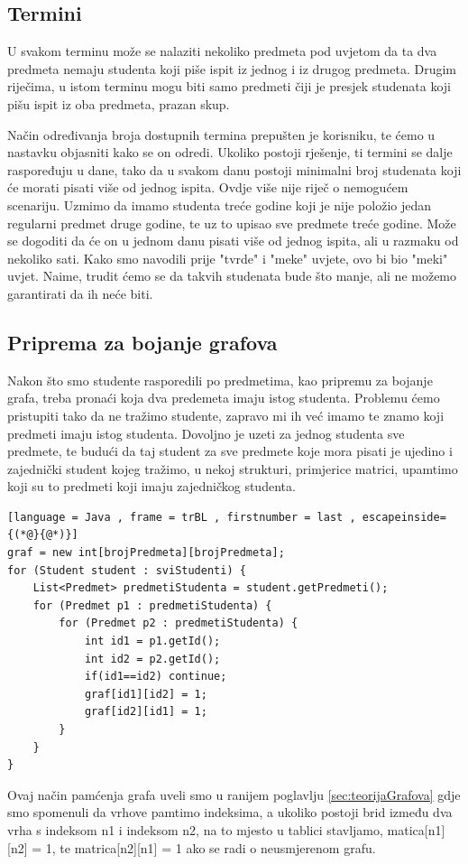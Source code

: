 \documentclass[times, utf8, zavrsni, numeric]{fer}
\begin{document}
\subsection*{Termini}
U svakom terminu može se nalaziti nekoliko predmeta pod uvjetom da ta dva predmeta nemaju studenta koji piše ispit iz jednog i iz drugog predmeta. Drugim riječima, u istom terminu mogu biti samo predmeti čiji je presjek studenata koji pišu ispit iz oba predmeta, prazan skup.\par
Način određivanja broja dostupnih termina prepušten je korisniku, te ćemo u nastavku objasniti kako se on odredi. Ukoliko postoji rješenje, ti termini se dalje raspoređuju u dane, tako da u svakom danu postoji minimalni broj studenata koji će morati pisati više od jednog ispita. Ovdje više nije riječ o nemogućem scenariju.
Uzmimo da imamo studenta treće godine koji je nije položio jedan regularni predmet druge godine, te uz to upisao sve predmete treće godine. Može se dogoditi da će on u jednom danu pisati više od jednog ispita, ali u razmaku od nekoliko sati. Kako smo navodili prije "tvrde" i "meke" uvjete, ovo bi bio "meki" uvjet. Naime, trudit ćemo se da takvih studenata bude što manje, ali ne možemo garantirati da ih neće biti.

\subsection*{Priprema za bojanje grafova}
Nakon što smo studente rasporedili po predmetima, kao pripremu za bojanje grafa, treba pronaći koja dva predemeta imaju istog studenta. Problemu ćemo pristupiti tako da ne tražimo studente, zapravo mi ih već imamo te znamo koji predmeti imaju istog studenta. Dovoljno je uzeti za jednog studenta sve predmete, te budući da taj student za sve predmete koje mora pisati je ujedino i zajednički student kojeg tražimo, u nekoj strukturi, primjerice matrici, upamtimo koji su to predmeti koji imaju zajedničkog studenta. 
\newpage
\begin{lstlisting}[language = Java , frame = trBL , firstnumber = last , escapeinside={(*@}{@*)}]
graf = new int[brojPredmeta][brojPredmeta];
for (Student student : sviStudenti) {
	List<Predmet> predmetiStudenta = student.getPredmeti();
	for (Predmet p1 : predmetiStudenta) {
		for (Predmet p2 : predmetiStudenta) {
			int id1 = p1.getId();
			int id2 = p2.getId();
			if(id1==id2) continue;
			graf[id1][id2] = 1;
			graf[id2][id1] = 1;
		}
	}
}
\end{lstlisting}

Ovaj način pamćenja grafa uveli smo u ranijem poglavlju \ref{sec:teorijaGrafova} gdje smo spomenuli da vrhove pamtimo indeksima, a ukoliko postoji brid između dva vrha s indeksom n1 i indeksom n2, na to mjesto u tablici stavljamo, matica[n1][n2] = 1, te matrica[n2][n1] = 1 ako se radi o neusmjerenom grafu.
\end{document}
